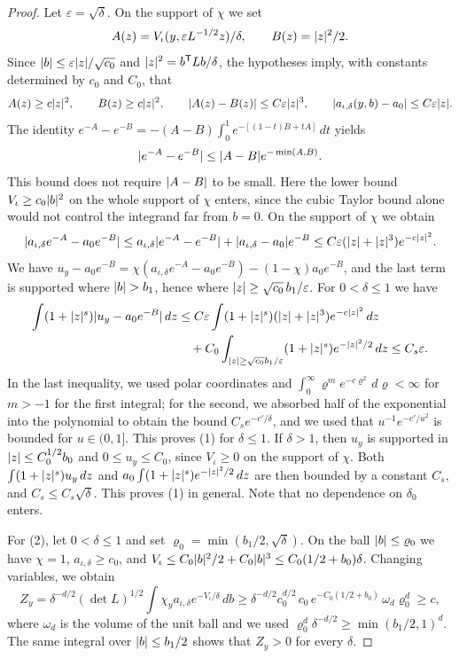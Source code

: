 \begin{proof}
Let $\varepsilon=\sqrt\delta$. On the support of $\chi$ we set
\[
 A(z)=V_\iota(y,\varepsilon L^{-1/2}z)/\delta,\qquad B(z)=\lvert z\rvert^2/2.
\]
Since $\lvert b\rvert\le\varepsilon\lvert z\rvert/\sqrt{c_0}$ and $\lvert z\rvert^2=b^{\mathsf T}Lb/\delta$, the hypotheses imply, with constants determined by $c_0$ and $C_0$, that
\[
 A(z)\ge c\lvert z\rvert^2,\qquad B(z)\ge c\lvert z\rvert^2,\qquad\lvert A(z)-B(z)\rvert\le C\varepsilon\lvert z\rvert^3,\qquad\lvert a_{\iota,\delta}(y,b)-a_0\rvert\le C\varepsilon\lvert z\rvert.
\]
The identity $e^{-A}-e^{-B}=-(A-B)\int_0^1e^{-[(1-t)B+tA]}\,dt$ yields
\begin{equation}\label{ch27:eq:exponential-difference}
 \lvert e^{-A}-e^{-B}\rvert\le\lvert A-B\rvert e^{-\min(A,B)}.
\end{equation}
This bound does not require $\lvert A-B\rvert$ to be small. Here the lower bound $V_\iota\ge c_0\lvert b\rvert^2$ on the whole support of $\chi$ enters, since the cubic Taylor bound alone would not control the integrand far from $b=0$. On the support of $\chi$ we obtain
\[
 \lvert a_{\iota,\delta}e^{-A}-a_0e^{-B}\rvert\le a_{\iota,\delta}\lvert e^{-A}-e^{-B}\rvert+\lvert a_{\iota,\delta}-a_0\rvert e^{-B}\le C\varepsilon(\lvert z\rvert+\lvert z\rvert^3)e^{-c\lvert z\rvert^2}.
\]
We have $u_y-a_0e^{-B}=\chi(a_{\iota,\delta}e^{-A}-a_0e^{-B})-(1-\chi)a_0e^{-B}$, and the last term is supported where $\lvert b\rvert>b_1$, hence where $\lvert z\rvert\ge\sqrt{c_0}\,b_1/\varepsilon$. For $0<\delta\le1$ we have
\begin{align*}
 \int(1+\lvert z\rvert^s)\lvert u_y-a_0e^{-B}\rvert\,dz&\le C\varepsilon\int(1+\lvert z\rvert^s)(\lvert z\rvert+\lvert z\rvert^3)e^{-c\lvert z\rvert^2}\,dz\\
 &\quad+C_0\int_{\lvert z\rvert\ge\sqrt{c_0}b_1/\varepsilon}(1+\lvert z\rvert^s)e^{-\lvert z\rvert^2/2}\,dz\le C_s\varepsilon.
\end{align*}
In the last inequality, we used polar coordinates and $\int_0^\infty\varrho^me^{-c\varrho^2}\,d\varrho<\infty$ for $m>-1$ for the first integral; for the second, we absorbed half of the exponential into the polynomial to obtain the bound $C_se^{-c'/\delta}$, and we used that $u^{-1}e^{-c'/u^2}$ is bounded for $u\in(0,1]$. This proves (1) for $\delta\le1$. If $\delta>1$, then $u_y$ is supported in $\lvert z\rvert\le C_0^{1/2}b_0$ and $0\le u_y\le C_0$, since $V_\iota\ge0$ on the support of $\chi$. Both $\int(1+\lvert z\rvert^s)u_y\,dz$ and $a_0\int(1+\lvert z\rvert^s)e^{-\lvert z\rvert^2/2}\,dz$ are then bounded by a constant $C_s$, and $C_s\le C_s\sqrt\delta$. This proves (1) in general. Note that no dependence on $\delta_0$ enters.

For (2), let $0<\delta\le1$ and set $\varrho_0=\min(b_1/2,\sqrt\delta)$. On the ball $\lvert b\rvert\le\varrho_0$ we have $\chi=1$, $a_{\iota,\delta}\ge c_0$, and $V_\iota\le C_0\lvert b\rvert^2/2+C_0\lvert b\rvert^3\le C_0(1/2+b_0)\delta$. Changing variables, we obtain
\[
 Z_y=\delta^{-d/2}(\det L)^{1/2}\int\chi_ya_{\iota,\delta}e^{-V_\iota/\delta}\,db\ge\delta^{-d/2}c_0^{d/2}\,c_0\,e^{-C_0(1/2+b_0)}\,\omega_d\varrho_0^d\ge c,
\]
where $\omega_d$ is the volume of the unit ball and we used $\varrho_0^d\delta^{-d/2}\ge\min(b_1/2,1)^d$. The same integral over $\lvert b\rvert\le b_1/2$ shows that $Z_y>0$ for every $\delta$.


\end{proof}
